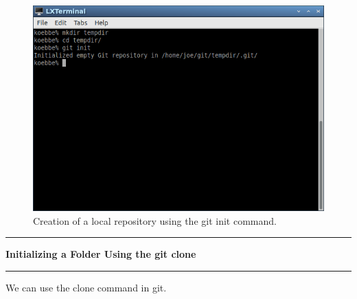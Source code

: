 \documentclass[10pt,fleqn]{article}
\begin{document}
\begin{figure}[h]
\centering
\includegraphics{../images/git_04.png}
\vskip0.1in
\caption{Creation of a local repository using the git init command.}
\end{figure}
\eject
\vskip0.1in\hrule\vskip0.1in\noindent
{\bf Initializing a Folder Using the git clone} 
\vskip0.1in\hrule\vskip0.1in\noindent
We can use the clone command in git.
\end{document}
